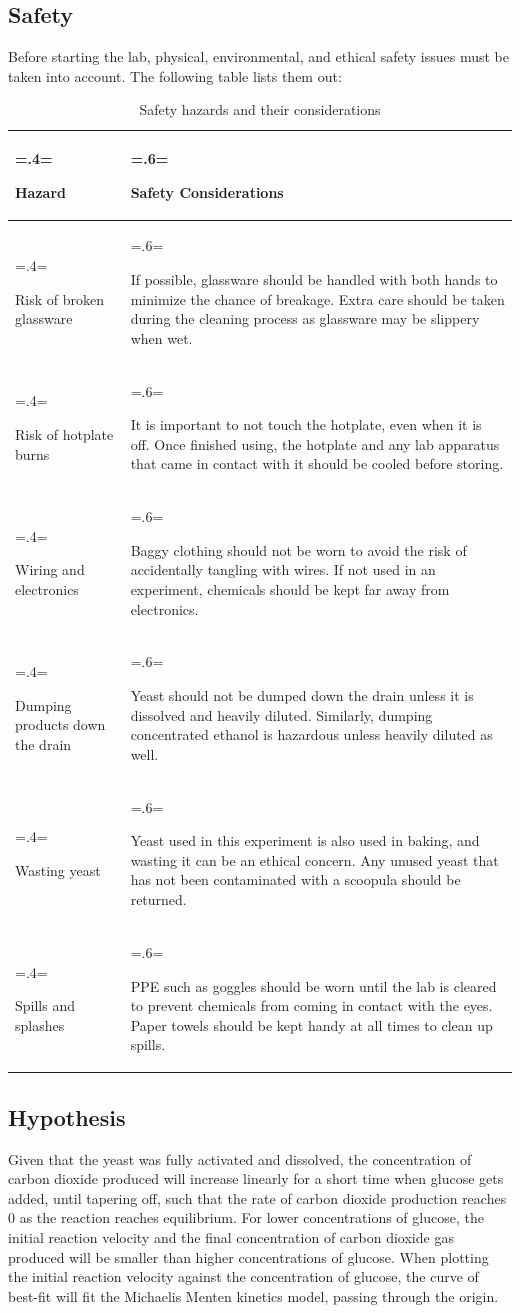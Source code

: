 \documentclass{article}
\begin{document}
\subsection{Safety}
Before starting the lab, physical, environmental, and ethical safety issues must be taken into account. The following table lists them out:
\begin{table}[H]
\centering
\caption{Safety hazards and their considerations}
\label{table:1}
\begin{tabularx}{\textwidth} {
    | >{\hsize=.4\hsize \linewidth=\hsize \raggedright\arraybackslash}X
    | >{\hsize=.6\hsize \linewidth=\hsize \raggedright\arraybackslash}X |
}
    \hline
    \rowcolor[HTML]{CCCCCC} Hazard & Safety Considerations \\
    \hline
    Risk of broken glassware & If possible, glassware should be handled with both hands to minimize the chance of breakage. Extra care should be taken during the cleaning process as glassware may be slippery when wet.\\
    \hline
    Risk of hotplate burns & It is important to not touch the hotplate, even when it is off. Once finished using, the hotplate and any lab apparatus that came in contact with it should be cooled before storing.\\
    \hline
    Wiring and electronics & Baggy clothing should not be worn to avoid the risk of accidentally tangling with wires. If not used in an experiment, chemicals should be kept far away from electronics.\\
    \hline
    Dumping products down the drain & Yeast should not be dumped down the drain unless it is dissolved and heavily diluted. Similarly, dumping concentrated ethanol is hazardous unless heavily diluted as well. \parencite{ref}\\
    \hline
    Wasting yeast & Yeast used in this experiment is also used in baking, and wasting it can be an ethical concern. Any unused yeast that has not been contaminated with a scoopula should be returned.\\
    \hline
    Spills and splashes & PPE such as goggles should be worn until the lab is cleared to prevent chemicals from coming in contact with the eyes. Paper towels should be kept handy at all times to clean up spills.\\
    \hline
\end{tabularx}
\end{table}

\subsection{Hypothesis}
Given that the yeast was fully activated and dissolved, the concentration of carbon dioxide produced will increase linearly for a short time when glucose gets added, until tapering off, such that the rate of carbon dioxide production reaches 0 as the reaction reaches equilibrium. For lower concentrations of glucose, the initial reaction velocity and the final concentration of carbon dioxide gas produced will be smaller than higher concentrations of glucose. When plotting the initial reaction velocity against the concentration of glucose, the curve of best-fit will fit the Michaelis Menten kinetics model, passing through the origin.
\end{document}
